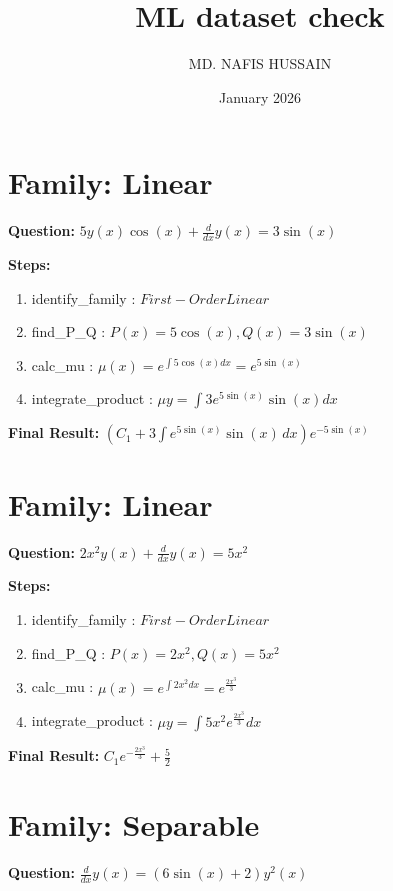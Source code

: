 \documentclass{article}
\title{ML dataset check}
\author{MD. NAFIS HUSSAIN}
\date{January 2026}
\begin{document}
\maketitle
\section*{Family: Linear}
\textbf{Question:} $5 y{\left(x \right)} \cos{\left(x \right)} + \frac{d}{d x} y{\left(x \right)} = 3 \sin{\left(x \right)}$

\textbf{Steps:}
\begin{enumerate}
\item identify_family :  $First-Order Linear$
\item find_P_Q :  $P(x)=5 \cos{\left(x \right)}, Q(x)=3 \sin{\left(x \right)}$
\item calc_mu :  $\mu(x) = e^{\int 5 \cos{\left(x \right)} dx} = e^{5 \sin{\left(x \right)}}$
\item integrate_product :  $\mu y = \int 3 e^{5 \sin{\left(x \right)}} \sin{\left(x \right)} dx$
\end{enumerate}
\textbf{Final Result:} $\left(C_{1} + 3 \int e^{5 \sin{\left(x \right)}} \sin{\left(x \right)}\, dx\right) e^{- 5 \sin{\left(x \right)}}$

\section*{Family: Linear}
\textbf{Question:} $2 x^{2} y{\left(x \right)} + \frac{d}{d x} y{\left(x \right)} = 5 x^{2}$

\textbf{Steps:}
\begin{enumerate}
\item identify_family :  $First-Order Linear$
\item find_P_Q :  $P(x)=2 x^{2}, Q(x)=5 x^{2}$
\item calc_mu :  $\mu(x) = e^{\int 2 x^{2} dx} = e^{\frac{2 x^{3}}{3}}$
\item integrate_product :  $\mu y = \int 5 x^{2} e^{\frac{2 x^{3}}{3}} dx$
\end{enumerate}
\textbf{Final Result:} $C_{1} e^{- \frac{2 x^{3}}{3}} + \frac{5}{2}$

\section*{Family: Separable}
\textbf{Question:} $\frac{d}{d x} y{\left(x \right)} = \left(6 \sin{\left(x \right)} + 2\right) y^{2}{\left(x \right)}$
\end{document}
